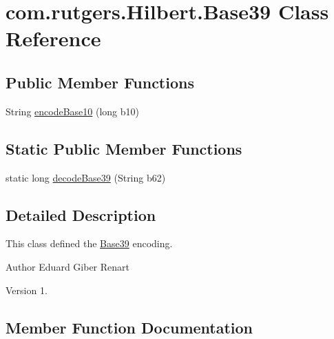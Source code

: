 \hypertarget{classcom_1_1rutgers_1_1Hilbert_1_1Base39}{}\section{com.\+rutgers.\+Hilbert.\+Base39 Class Reference}
\label{classcom_1_1rutgers_1_1Hilbert_1_1Base39}
\subsection*{Public Member Functions}
\begin{DoxyCompactItemize}
\item 
String \hyperlink{classcom_1_1rutgers_1_1Hilbert_1_1Base39_a042a8fe52c1e68fcbde5bcb10f9cae5e}{encode\+Base10} (long b10)
\end{DoxyCompactItemize}
\subsection*{Static Public Member Functions}
\begin{DoxyCompactItemize}
\item 
static long \hyperlink{classcom_1_1rutgers_1_1Hilbert_1_1Base39_ad90f8e29d50c7384c1f149e1bd136de1}{decode\+Base39} (String b62)
\end{DoxyCompactItemize}


\subsection{Detailed Description}
This class defined the \hyperlink{classcom_1_1rutgers_1_1Hilbert_1_1Base39}{Base39} encoding.

\begin{DoxyAuthor}{Author}
Eduard Giber Renart 
\end{DoxyAuthor}
\begin{DoxyVersion}{Version}
1. 
\end{DoxyVersion}


\subsection{Member Function Documentation}
\mbox{\label{classcom_1_1rutgers_1_1Hilbert_1_1Base39_ad90f8e29d50c7384c1f149e1bd136de1}} 

